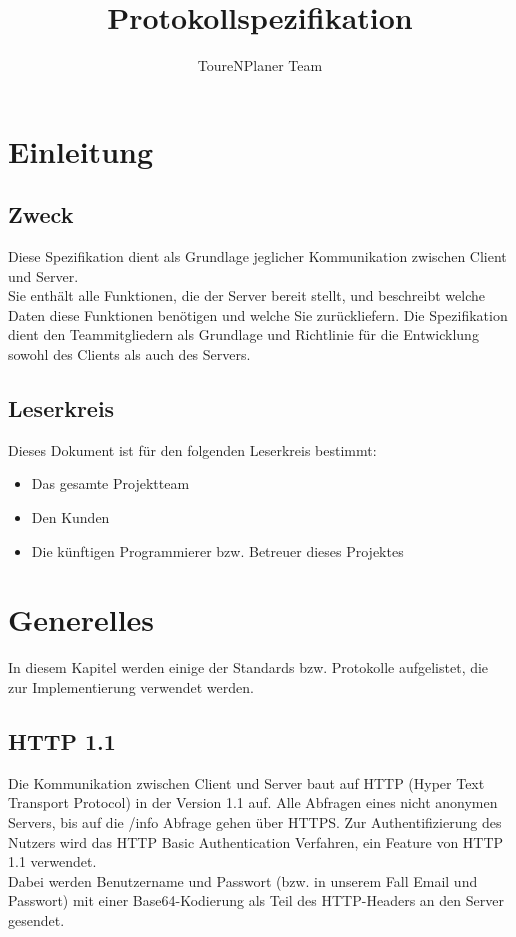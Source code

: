 \documentclass[ngerman,titlepage]{scrartcl}
\title{Protokollspezifikation}
\author{ToureNPlaner Team}
\begin{document}
\maketitle

\tableofcontents

\pagebreak

\section{Einleitung}

	\subsection{Zweck}
	
	Diese Spezifikation dient als Grundlage jeglicher Kommunikation zwischen Client und Server.\\
	Sie enthält alle Funktionen, die der Server bereit stellt, und beschreibt welche Daten diese Funktionen benötigen und welche Sie zurückliefern. 
	Die Spezifikation dient den Teammitgliedern als Grundlage und Richtlinie für die Entwicklung sowohl des Clients als auch des Servers.
	
	\subsection{Leserkreis}
	
	Dieses Dokument ist für den folgenden Leserkreis bestimmt:
	
	\begin{itemize}
		\item Das gesamte Projektteam
		\item Den Kunden
		\item Die künftigen Programmierer bzw. Betreuer dieses Projektes
	\end{itemize}
	
\section{Generelles}

	In diesem Kapitel werden einige der Standards bzw. Protokolle aufgelistet, die zur Implementierung verwendet werden.

	\subsection{HTTP 1.1}

	Die Kommunikation zwischen Client und Server baut auf HTTP (Hyper Text Transport Protocol) in der Version 1.1 auf. Alle Abfragen eines nicht anonymen Servers, bis auf die /info Abfrage gehen über HTTPS.
	Zur Authentifizierung des Nutzers wird das HTTP Basic Authentication Verfahren, ein Feature von HTTP 1.1 verwendet.\\
	Dabei werden Benutzername und Passwort (bzw. in unserem Fall Email und Passwort) mit einer Base64-Kodierung als Teil des HTTP-Headers an den Server gesendet.
	
\end{document}
